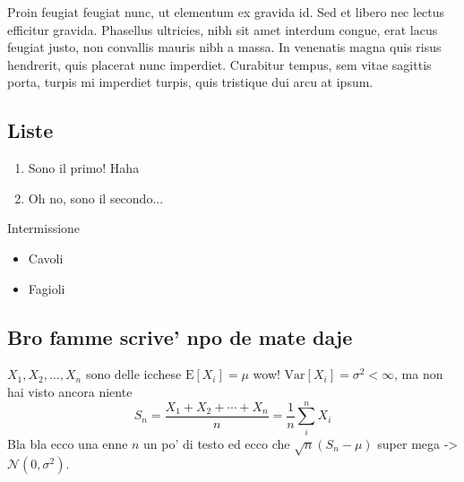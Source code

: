 \documentclass{article}
\begin{document}
Proin feugiat feugiat nunc, ut elementum ex gravida id. Sed et libero nec lectus efficitur gravida. Phasellus ultricies, nibh sit amet interdum congue, erat lacus feugiat justo, non convallis mauris nibh a massa. In venenatis magna quis risus hendrerit, quis placerat nunc imperdiet. Curabitur tempus, sem vitae sagittis porta, turpis mi imperdiet turpis, quis tristique dui arcu at ipsum.

\subsection{Liste}

\begin{enumerate}
\item Sono il primo! Haha
\item Oh no, sono il secondo...
\end{enumerate}
Intermissione
\begin{itemize}
\item Cavoli
\item Fagioli
\end{itemize}

\subsection{Bro famme scrive' npo de mate daje}

$X_1, X_2, \ldots, X_n$ sono delle icchese $\text{E}[X_i] = \mu$ wow! $\text{Var}[X_i] = \sigma^2 < \infty$, ma non hai visto ancora niente
\[S_n = \frac{X_1 + X_2 + \cdots + X_n}{n}
      = \frac{1}{n}\sum_{i}^{n} X_i\]
Bla bla ecco una enne $n$ un po' di testo ed ecco che $\sqrt{n}(S_n - \mu)$ super mega -> $\mathcal{N}(0, \sigma^2)$.
\end{document}
